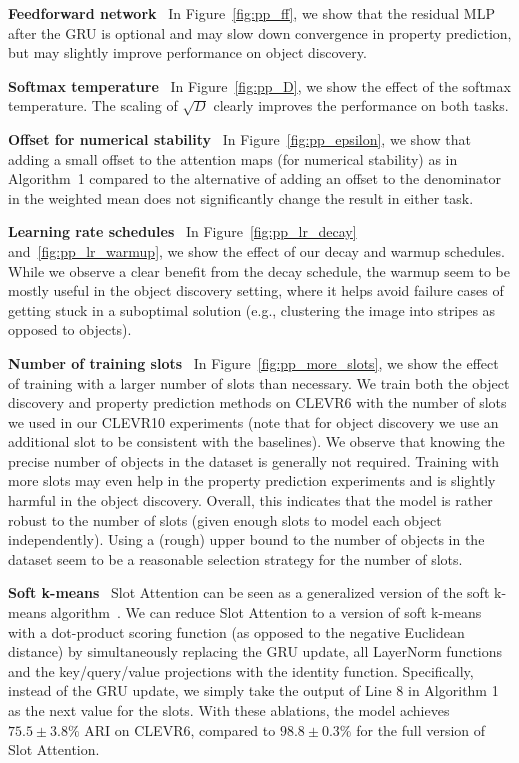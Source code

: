 \documentclass{article}
\begin{document}
\textbf{Feedforward network} \ In Figure~\ref{fig:pp_ff}, we show that the residual MLP after the GRU is optional and may slow down convergence in property prediction, but may slightly improve performance on object discovery.

\textbf{Softmax temperature} \ In Figure~\ref{fig:pp_D}, we show the effect of the softmax temperature. The scaling of  $\sqrt{D}$ clearly improves the performance on both tasks.

\textbf{Offset for numerical stability} \ In Figure~\ref{fig:pp_epsilon}, we show that adding a small offset to the attention maps (for numerical stability) as in Algorithm~1 compared to the alternative of adding an offset to the denominator in the weighted mean does not significantly change the result in either task.

\textbf{Learning rate schedules} \ In Figure~\ref{fig:pp_lr_decay} and~\ref{fig:pp_lr_warmup}, we show the effect of our decay and warmup schedules. While we observe a clear benefit from the decay schedule, the warmup seem to be mostly useful in the object discovery setting, where it helps avoid failure cases of getting stuck in a suboptimal solution (e.g., clustering the image into stripes as opposed to objects).

\textbf{Number of training slots} \ In Figure~\ref{fig:pp_more_slots}, we show the effect of training with a larger number of slots than necessary. We train both the object discovery and property prediction methods on CLEVR6 with the number of slots we used in our CLEVR10 experiments (note that for object discovery we use an additional slot to be consistent with the baselines). We observe that knowing the precise number of objects in the dataset is generally not required. Training with more slots may even help in the property prediction experiments and is slightly harmful in the object discovery. Overall, this indicates that the model is rather robust to the number of slots (given enough slots to model each object independently). Using a (rough) upper bound to the number of objects in the dataset seem to be a reasonable selection strategy for the number of slots.


\textbf{Soft k-means} \ Slot Attention can be seen as a generalized version of the soft k-means algorithm~\citep{bauckhage2015lecture}. We can reduce Slot Attention to a version of soft k-means with a dot-product scoring function (as opposed to the negative Euclidean distance) by simultaneously replacing the GRU update, all LayerNorm functions and the key/query/value projections with the identity function. Specifically, instead of the GRU update, we simply take the output of Line 8 in Algorithm 1 as the next value for the slots. With these ablations, the model achieves $75.5\pm3.8\%$ ARI on CLEVR6, compared to $98.8\pm0.3\%$ for the full version of Slot Attention.
\end{document}
